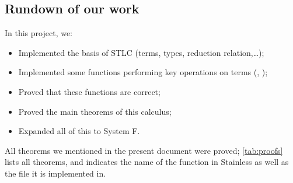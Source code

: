 \subsection{Rundown of our work}
In this project, we:
\begin{itemize}
    \item Implemented the basis of STLC (terms, types, reduction relation,\ldots);
    \item Implemented some functions performing key operations on terms (, );
    \item Proved that these functions are correct;
    \item Proved the main theorems of this calculus;
    \item Expanded all of this to System F.
\end{itemize}
All theorems we mentioned in the present document were proved; 
\cref{tab:proofs} lists all theorems, and indicates the name of the function in Stainless as well as the file it is implemented in.

